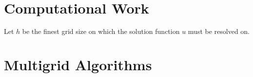 \documentclass[12pt]{article}
\begin{document}
\section{Computational Work}

Let $h$ be the finest grid size on which the solution function $u$ must be resolved on. 

\section{Multigrid Algorithms} \label{sec:multigrid}

\end{document}
